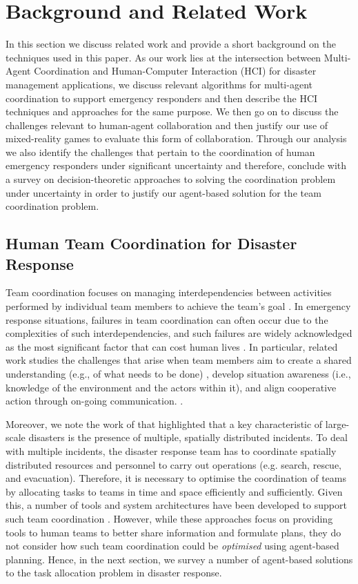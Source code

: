 \section{Background and Related Work}\label{sec:relatedwork}
In this section we discuss related work and provide a short background on the techniques used in this paper.  As our work lies at the intersection between Multi-Agent Coordination and Human-Computer Interaction (HCI) for disaster management applications, we discuss relevant algorithms for multi-agent coordination to support emergency responders and then describe the HCI techniques and approaches for the same purpose. We then go on to discuss the challenges relevant to human-agent collaboration and then justify our use of mixed-reality games to evaluate this form of collaboration.  Through our analysis we also identify the challenges that pertain to the coordination of human emergency responders under significant uncertainty and therefore, conclude with a survey on decision-theoretic approaches to solving the coordination problem under uncertainty in order to justify our agent-based solution for the team coordination problem.
\subsection{Human Team Coordination for Disaster Response}
Team coordination focuses on managing interdependencies between activities performed  by individual team members to achieve the team's goal \cite{Malone1990}. In emergency response situations, failures in team coordination can often occur due to the complexities of such interdependencies, and such failures are widely acknowledged as the most significant factor that can cost human lives \cite[p. 2]{Toups2011}. In particular, related work studies the challenges that arise when team members aim to create a shared understanding (e.g., of what needs to be done) \cite{Convertino2011}, develop situation awareness (i.e., knowledge of the environment and the actors within it), and align cooperative action through on-going communication.  .

Moreover, we note the work of \cite{chen2005} that highlighted that a key characteristic of large-scale disasters is the presence of multiple, spatially distributed incidents. To deal with multiple incidents, the disaster response team has to coordinate spatially distributed resources and personnel to carry out operations (e.g. search, rescue, and evacuation). Therefore, it is necessary to optimise the coordination of teams by allocating tasks to teams in time and space efficiently and sufficiently. Given this, a number of tools and system architectures have been developed to support such team coordination \cite{Monares2011} \cite{Padilha2010} \cite{Convertino2011}. However, while these approaches focus on providing tools to human teams to better share  information and formulate plans,  they do not consider how such team coordination could be \emph{optimised} using agent-based planning. Hence, in the next section, we  survey a number of agent-based solutions to the task allocation problem in disaster response.

